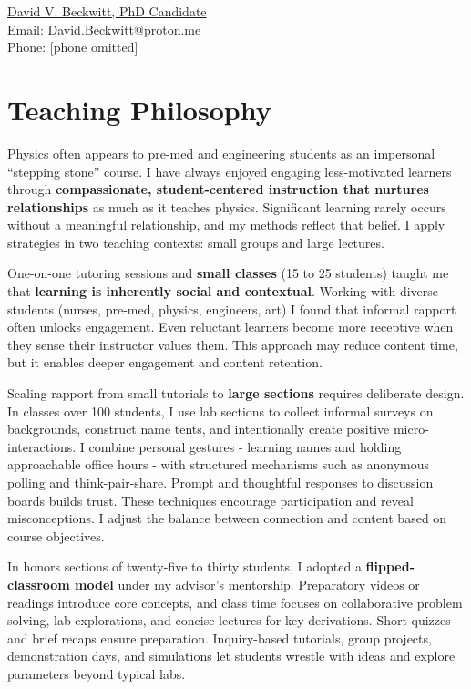 \documentclass[11pt]{article}
\begin{document}
\href{https://www.linkedin.com/in/dvbeckwitt/}{David V. Beckwitt, PhD Candidate}\\
Email: David.Beckwitt@proton.me\\
Phone: [phone omitted]
\section*{Teaching Philosophy}

Physics often appears to pre-med and engineering students as an impersonal “stepping stone” course. I have always enjoyed engaging less-motivated learners through \textbf{compassionate, student-centered instruction that nurtures relationships} as much as it teaches physics. Significant learning rarely occurs without a meaningful relationship, and my methods reflect that belief. I apply strategies in two teaching contexts: small groups and large lectures. 

 One-on-one tutoring sessions and \textbf{small classes} (15 to 25 students) taught me that \textbf{learning is inherently social and contextual}. Working with diverse students (nurses, pre-med, physics, engineers, art) I found that informal rapport often unlocks engagement. Even reluctant learners become more receptive when they sense their instructor values them. This approach may reduce content time, but it enables deeper engagement and content retention.

Scaling rapport from small tutorials to \textbf{large sections} requires deliberate design. In classes over 100 students, I use lab sections to collect informal surveys on backgrounds, construct name tents, and intentionally create positive micro-interactions. I combine personal gestures - learning names and holding approachable office hours - with structured mechanisms such as anonymous polling and think-pair-share. Prompt and thoughtful responses to discussion boards builds trust. These techniques encourage participation and reveal misconceptions. I adjust the balance between connection and content based on course objectives.

In honors sections of twenty-five to thirty students, I adopted a \textbf{flipped-classroom model} under my advisor’s mentorship. Preparatory videos or readings introduce core concepts, and class time focuses on collaborative problem solving, lab explorations, and concise lectures for key derivations. Short quizzes and brief recaps ensure preparation. Inquiry-based tutorials, group projects, demonstration days, and simulations let students wrestle with ideas and explore parameters beyond typical labs.
\end{document}
